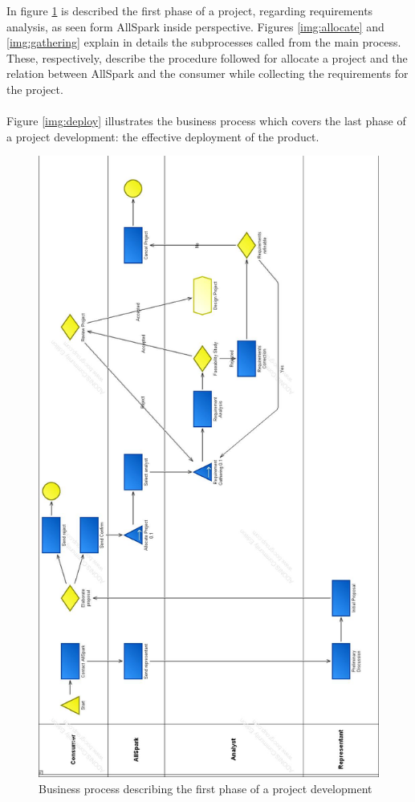 In figure \ref{img:analysis} is described the first phase of a project,
regarding requirements analysis, as seen form AllSpark inside perspective.
Figures \ref{img:allocate} and \ref{img:gathering} explain in details the 
subprocesses called from the main process.
These, respectively, describe the procedure followed for allocate
a project and the relation between AllSpark and the consumer while collecting 
the requirements for the project.
\paragraph{}
Figure \ref{img:deploy} illustrates the business process which covers the last
phase of a project development: the effective deployment of the product.


\begin{figure}
\centering
\includegraphics[scale=0.30]{adonis_diagrams/analysis}
\caption{Business process describing the first phase of a project development}
\label{img:analysis}
\end{figure}

